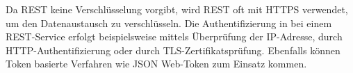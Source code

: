 
Da REST keine Verschlüsselung vorgibt, wird REST oft mit HTTPS verwendet, um den Datenaustausch zu verschlüsseln. Die Authentifizierung in bei einem REST-Service erfolgt beispielsweise mittels Überprüfung der IP-Adresse, durch HTTP-Authentifizierung oder durch TLS-Zertifikatsprüfung. Ebenfalls können Token basierte Verfahren wie JSON Web-Token zum Einsatz kommen. \cite{WikiREST}